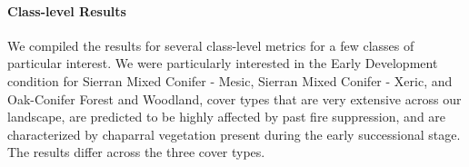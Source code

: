 %

\paragraph{Class-level Results} We compiled the results for several class-level metrics for a few classes of particular interest. We were particularly interested in the Early Development condition for Sierran Mixed Conifer - Mesic, Sierran Mixed Conifer - Xeric, and Oak-Conifer Forest and Woodland, cover types that are very extensive across our landscape, are predicted to be highly affected by past fire suppression, and are characterized by chaparral vegetation present during the early successional stage. The results differ across the three cover types. 

